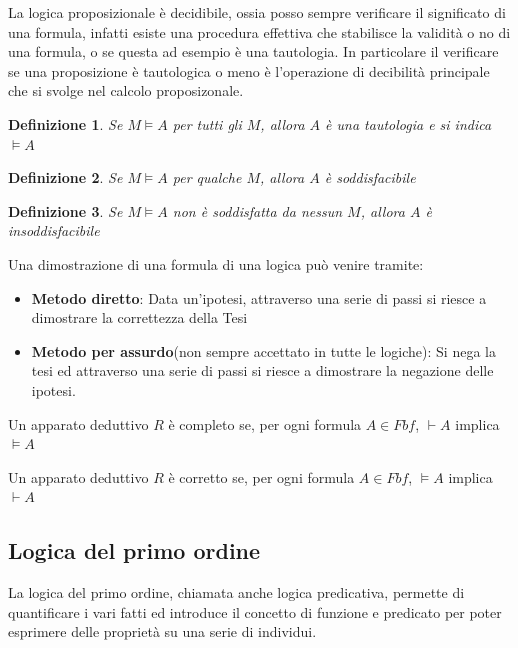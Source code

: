 \documentclass[a4paper]{report}
\newtheorem{defi}{Definizione}%
\begin{document}
La logica proposizionale è decidibile, ossia posso sempre verificare il significato di una formula, infatti esiste
una procedura effettiva che stabilisce la validità o no di una formula, o se questa ad esempio è una tautologia.
In particolare il verificare se una proposizione è tautologica o meno è l’operazione di decibilità principale che si svolge
nel calcolo proposizonale.

\begin{defi}
    Se $M \models A$ per tutti gli $M$, allora $A$ è una tautologia e si indica $\models A$
\end{defi}

\begin{defi}
    Se $M \models A$ per qualche $M$, allora $A$ è soddisfacibile
\end{defi}

\begin{defi}
Se $M \models A$ non è soddisfatta da nessun $M$, allora $A$ è insoddisfacibile
\end{defi}

Una dimostrazione di una formula di una logica può venire tramite:
\begin{itemize}
  \item  \textbf{Metodo diretto}: Data un'ipotesi, attraverso una serie di passi
          si riesce a dimostrare la correttezza della Tesi
  \item \textbf{Metodo per assurdo}(non sempre accettato in tutte le logiche):
        Si nega la tesi ed attraverso una serie di passi si riesce a dimostrare
        la negazione delle ipotesi.
\end{itemize}

\begin{thm}
    Un apparato deduttivo $R$ è completo se, per ogni formula $A \in Fbf$, $\vdash A$
    implica $\models A$
\end{thm}

\begin{thm}
    Un apparato deduttivo $R$ è corretto se, per ogni formula $A \in Fbf$, $\models A$
    implica $\vdash A$
\end{thm}

\subsection{Logica del primo ordine}
La logica del primo ordine, chiamata anche logica predicativa, permette di quantificare i vari fatti ed introduce il concetto di funzione e
predicato per poter esprimere delle proprietà su una serie di individui.
\end{document}
